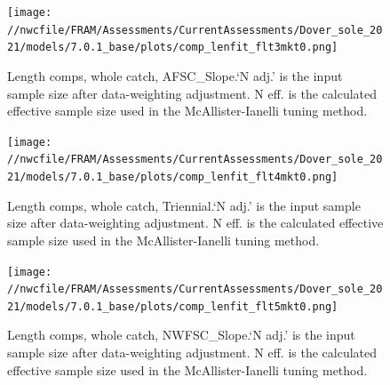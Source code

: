 \documentclass[11pt,
  english,
  a4paper,
]{article}
\begin{document}
\tagmcend\tagstructend


\begin{figure}
\centering
\texttt{[image: //nwcfile/FRAM/Assessments/CurrentAssessments/Dover\_sole\_2021/models/7.0.1\_base/plots/comp\_lenfit\_flt3mkt0.png]}
\caption{Length comps, whole catch, AFSC\_Slope.`N adj.' is the input sample size after data-weighting adjustment. N eff. is the calculated effective sample size used in the McAllister-Ianelli tuning method.\label{fig:comp_lenfit_flt3mkt0}}
\end{figure}

\tagmcend\tagstructend


\begin{figure}
\centering
\texttt{[image: //nwcfile/FRAM/Assessments/CurrentAssessments/Dover\_sole\_2021/models/7.0.1\_base/plots/comp\_lenfit\_flt4mkt0.png]}
\caption{Length comps, whole catch, Triennial.`N adj.' is the input sample size after data-weighting adjustment. N eff. is the calculated effective sample size used in the McAllister-Ianelli tuning method.\label{fig:comp_lenfit_flt4mkt0}}
\end{figure}

\tagmcend\tagstructend


\begin{figure}
\centering
\texttt{[image: //nwcfile/FRAM/Assessments/CurrentAssessments/Dover\_sole\_2021/models/7.0.1\_base/plots/comp\_lenfit\_flt5mkt0.png]}
\caption{Length comps, whole catch, NWFSC\_Slope.`N adj.' is the input sample size after data-weighting adjustment. N eff. is the calculated effective sample size used in the McAllister-Ianelli tuning method.\label{fig:comp_lenfit_flt5mkt0}}
\end{figure}
\end{document}
